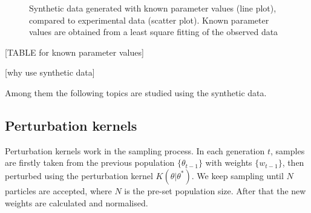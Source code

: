 \documentclass[12pt,a4paper]{report}
\begin{document}
\begin{figure}[h!]
    \begin{center}
    \end{center}

    \caption[Synthetic data generated with known parameter values]%
    {Synthetic data generated with known parameter values (line plot), compared to experimental data (scatter plot). Known parameter values are obtained from a least square fitting of the observed data}
    \label{fig:infer_back_data}

\end{figure}

[TABLE for known parameter values]

[why use synthetic data]

Among them the following topics are studied using the synthetic data.

\subsection{Perturbation kernels}

Perturbation kernels work in the sampling process. In each generation $t$, samples are firstly taken from the previous population $\{\theta_{t-1}\}$ with weights $\{w_{t-1}\}$, then perturbed using the perturbation kernel $K(\theta|\theta^*)$. We keep sampling until $N$ particles are accepted, where $N$ is the pre-set population size. After that the new weights are calculated and normalised.


\end{document}
